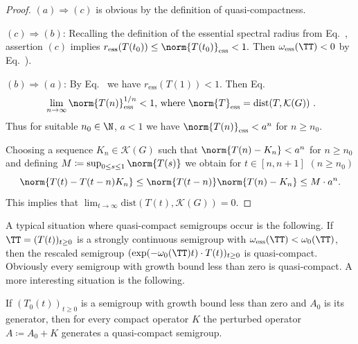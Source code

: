 \begin{proof}
$(a) \Rightarrow (c)$ is obvious by the definition of quasi-compactness.

$(c) \Rightarrow (b)$: Recalling the definition of the essential spectral radius from 
 Eq.~,
assertion $(c)$ implies 
$r_{\text{ess}}(T(t_0)) \leq \norm{T(t_0)}_{\text{ess}} < 1 .$ 
Then  $\omega_{\text{ess}}(\TT) < 0 $ by  
Eq.~).

$(b) \Rightarrow (a)$: By 
 Eq.~
we have $r_{\text{ess}}(T(1)) < 1$. 
Then 
 Eq.~
\[
\text{
$\lim_{n \to \infty}\norm{T(n)}_{\text{ess}}^{1/n} < 1$,  where $\norm{T}_{\text{ess}} = \mathrm{dist}(T,\mathcal{K}(G))$ .}
\]
Thus for suitable $n_{0} \in \N$, $a < 1$ we have $\norm{T(n)}_{\text{ess}} < a^n$ for $n \geq n_{0}$.

Choosing a sequence $K_n \in \mathcal{K}(G)$ such that $\norm{T(n) - K_n} < a^n$ for $n \geq n_{0}$ and defining $M \coloneqq \sup_{0 \leq s \leq 1}\norm{T(s)}$ we obtain for $t \in [n,n+1]$ $(n \geq n_{0})$ 
\[
\norm{T(t) - T(t-n)K_n} \leq \norm{T(t-n)}\norm{T(n) - K_n} \leq M \cdot a^n .
\] 
This implies that $\lim_{t \to \infty}\mathrm{dist}(T(t),\mathcal{K}(G)) = 0 .$
\end{proof}
A typical situation where quasi-compact semigroups occur is the following. 
If\/ $\TT = (T(t))_{t \geq 0}$ is a strongly continuous semigroup with $\omega_{\text{ess}}(\TT) < \omega_{0}(\TT)$, then the rescaled semigroup $(\text{exp}(-\omega_{0}(\TT)t)\cdot T(t))_{t \geq 0}$ is quasi-compact. 
Obviously every semigroup with growth bound less than zero is quasi-compact. 
A more interesting situation is the following.

If\/ $(T_{0}(t))_{t \geq 0}$ is a semigroup with growth bound less than zero and $A_{0}$ is its generator, then for every compact operator $K$ the perturbed operator $A \coloneqq A_{0} + K$ generates a quasi-compact semigroup.
	

